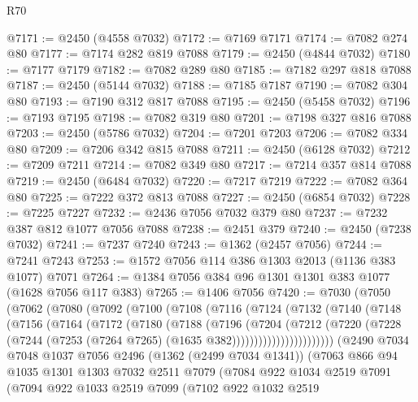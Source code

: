 \begin{lexlean}{R70}
\begin{coremodule}
@7171 := @2450 (@4558 @7032)
@7172 := @7169 @7171
@7174 := @7082 @274 @80
@7177 := @7174 @282 @819 @7088
@7179 := @2450 (@4844 @7032)
@7180 := @7177 @7179
@7182 := @7082 @289 @80
@7185 := @7182 @297 @818 @7088
@7187 := @2450 (@5144 @7032)
@7188 := @7185 @7187
@7190 := @7082 @304 @80
@7193 := @7190 @312 @817 @7088
@7195 := @2450 (@5458 @7032)
@7196 := @7193 @7195
@7198 := @7082 @319 @80
@7201 := @7198 @327 @816 @7088
@7203 := @2450 (@5786 @7032)
@7204 := @7201 @7203
@7206 := @7082 @334 @80
@7209 := @7206 @342 @815 @7088
@7211 := @2450 (@6128 @7032)
@7212 := @7209 @7211
@7214 := @7082 @349 @80
@7217 := @7214 @357 @814 @7088
@7219 := @2450 (@6484 @7032)
@7220 := @7217 @7219
@7222 := @7082 @364 @80
@7225 := @7222 @372 @813 @7088
@7227 := @2450 (@6854 @7032)
@7228 := @7225 @7227
@7232 := @2436 @7056 @7032 @379 @80
@7237 := @7232 @387 @812 @1077 @7056 @7088
@7238 := @2451 @379
@7240 := @2450 (@7238 @7032)
@7241 := @7237 @7240
@7243 := @1362 (@2457 @7056)
@7244 := @7241 @7243
@7253 := @1572 @7056 @114 @386 @1303 @2013 (@1136 @383 @1077) @7071
@7264 := @1384 @7056 @384 @96 @1301 @1301 @383 @1077 (@1628 @7056 @117 @383)
@7265 := @1406 @7056
@7420 := @7030
    (@7050
      (@7062
        (@7080
          (@7092
            (@7100
              (@7108
                (@7116
                  (@7124
                    (@7132
                      (@7140
                        (@7148
                          (@7156
                            (@7164
                              (@7172
                                (@7180
                                  (@7188
                                    (@7196
                                      (@7204
                                        (@7212
                                          (@7220
                                            (@7228
                                              (@7244
                                                (@7253
                                                  (@7264 @7265)
                                                  (@1635 @382)))))))))))))))))))))))
      (@2490
        @7034
        @7048
        @1037
        @7056
        @2496
        (@1362 (@2499 @7034 @1341))
        (@7063
          @866
          @94
          @1035
          @1301
          @1303
          @7032
          @2511
          @7079
          (@7084
            @922
            @1034
            @2519
            @7091
            (@7094
              @922
              @1033
              @2519
              @7099
              (@7102
                @922
                @1032
                @2519

\end{coremodule}
\end{lexlean}

